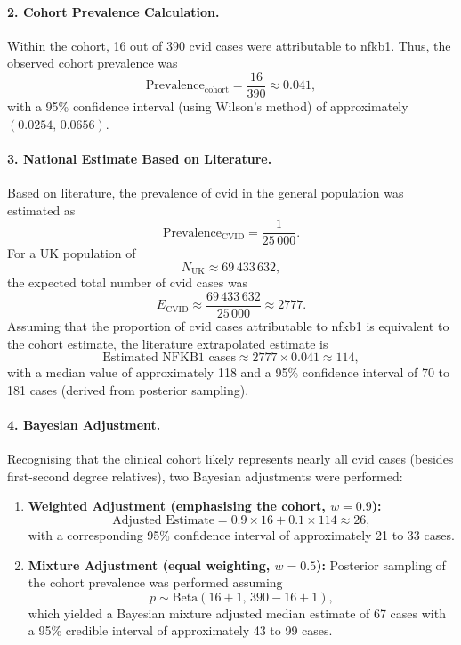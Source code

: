 \paragraph{2. Cohort Prevalence Calculation.}
Within the cohort, 16 out of 390 \ac{cvid} cases were attributable to \ac{nfkb1}. Thus, the observed cohort prevalence was
\[
\text{Prevalence}_{\text{cohort}} = \frac{16}{390} \approx 0.041,
\]
with a 95\% confidence interval (using Wilson's method) of approximately \((0.0254,\,0.0656)\).

\paragraph{3. National Estimate Based on Literature.}
Based on literature, the prevalence of \ac{cvid} in the general population was estimated as
\[
\text{Prevalence}_{\text{CVID}} = \frac{1}{25\,000}.
\]
For a UK population of 
\[
N_{\text{UK}} \approx 69\,433\,632,
\]
the expected total number of \ac{cvid} cases was
\[
E_{\text{CVID}} \approx \frac{69\,433\,632}{25\,000} \approx 2777.
\]
Assuming that the proportion of \ac{cvid} cases attributable to \ac{nfkb1} is equivalent to the cohort estimate, the literature extrapolated estimate is
\[
\text{Estimated NFKB1 cases} \approx 2777 \times 0.041 \approx 114,
\]
with a median value of approximately 118 and a 95\% confidence interval of 70 to 181 cases (derived from posterior sampling).

\paragraph{4. Bayesian Adjustment.}
Recognising that the clinical cohort likely represents nearly all \ac{cvid} cases (besides first-second degree relatives), two Bayesian adjustments were performed:
\begin{enumerate}
  \item \textbf{Weighted Adjustment (emphasising the cohort, \(w=0.9\)):}
  \[
  \text{Adjusted Estimate} = 0.9 \times 16 + 0.1 \times 114 \approx 26,
  \]
  with a corresponding 95\% confidence interval of approximately 21 to 33 cases.
  
  \item \textbf{Mixture Adjustment (equal weighting, \(w=0.5\)):}  
  Posterior sampling of the cohort prevalence was performed assuming
  \[
  p \sim \mathrm{Beta}(16+1,\,390-16+1),
  \]
  which yielded a Bayesian mixture adjusted median estimate of 67 cases with a 95\% credible interval of approximately 43 to 99 cases.
\end{enumerate}

